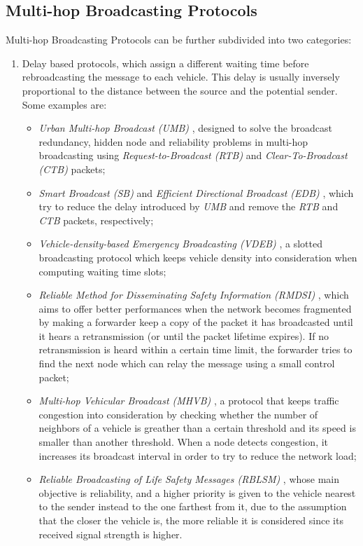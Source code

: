 \begin{enumerate}
		\subsection{Multi-hop Broadcasting Protocols}
		
		Multi-hop Broadcasting Protocols can be further subdivided into two categories:
		\begin{enumerate}
			\item Delay based protocols, which assign a different waiting time before rebroadcasting the message to each vehicle. This delay is usually inversely proportional to the distance between the source and the potential sender.
			Some examples are:
			\begin{itemize}
				\renewcommand\labelitemi{--}
				\item \textit{Urban Multi-hop Broadcast (UMB)} \cite{Korkmaz:2004:UMB:1023875.1023887}, designed to solve the broadcast redundancy, hidden node and reliability problems in multi-hop broadcasting using \textit{Request-to-Broadcast (RTB)} and \textit{Clear-To-Broadcast (CTB)} packets; 
				\item \textit{Smart Broadcast (SB)} \cite{4025102} and \textit{Efficient Directional Broadcast (EDB)} \cite{4340158}, which try to reduce the delay introduced by \textit{UMB} and remove the \textit{RTB} and \textit{CTB} packets, respectively;
				\item \textit{Vehicle-density-based Emergency Broadcasting (VDEB)} \cite{5663803}, a slotted broadcasting protocol which keeps vehicle density into consideration when computing waiting time slots;
				\item \textit{Reliable Method for Disseminating Safety Information
					(RMDSI)} \cite{4591259}, which aims to offer better performances when the network becomes fragmented by making a forwarder keep a copy of the packet it has broadcasted until it hears a retransmission (or until the packet lifetime expires). If no retransmission is heard within a certain time limit, the forwarder tries to find the next node which can relay the message using a small control packet;
				\item \textit{Multi-hop Vehicular Broadcast (MHVB)} \cite{4068699}, a protocol that keeps traffic congestion into consideration by   checking whether the number of neighbors of a vehicle is greather than a certain threshold and its speed is smaller than another threshold. When a node detects congestion, it increases its broadcast interval in order to try to reduce the network load;
				\item \textit{Reliable Broadcasting of Life Safety Messages (RBLSM)} \cite{4458046}, whose main objective is reliability, and a higher priority is given to the vehicle nearest to the sender instead to the one farthest from it, due to the assumption that the closer the vehicle is, the more reliable it is considered since its received signal strength is higher.
			\end{itemize}
			

\end{enumerate}
\end{enumerate}
